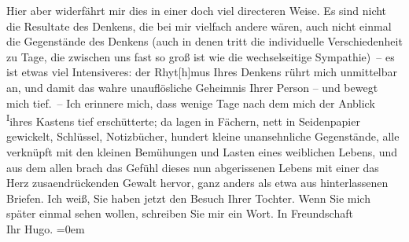\begin{ledgroupsized}[t]{13cm}
                    Hier aber widerfährt mir dies in einer doch viel directeren Weise. Es sind nicht
                    die Resultate des Denkens, die bei mir vielfach andere wären, auch nicht einmal
                    die Gegenstände des Denkens (auch in denen tritt die individuelle
                    Verschiedenheit zu Tage, die zwischen uns fast so groß ist wie die
                    wechselseitige Sympathie) – {\pb}es ist etwas viel Intensiveres: der Rhyt{[}h{]}mus Ihres
                    Denkens rührt mich unmittelbar an, und damit das wahre unauflösliche Geheimnis
                    Ihrer Person – und bewegt mich tief. – Ich erinnere mich, dass wenige Tage nach
                    dem \label{K_L02496_1v}\label{K_L02496_1h} mich der Anblick \substVorne{}\textsuperscript{I}\substDazwischen{}i\substHinten{}hres Kastens tief erschütterte; da lagen in Fächern, nett in
                    Seidenpapier gewickelt, Schlüssel, Notizbücher, hundert kleine unansehnliche
                    Gegenstände, alle verknüpft mit den kleinen Bemühungen und Lasten eines
                    weiblichen Lebens, und aus dem allen brach das Gefühl dieses nun abgerissenen
                    Lebens mit einer das Herz zusa{\geminationm}endrückenden Gewalt
                    hervor, ganz anders als etwa aus hinterlassenen Briefen.\pend
           \pstart
           Ich weiß, Sie haben jetzt den Besuch Ihrer Tochter. Wenn Sie mich später einmal sehen wollen,
                    schreiben Sie mir ein Wort.\pend
           \pstart
           In Freundschaft{\\[\baselineskip]}Ihr \spacefill\mbox{Hugo.}\pend
           \leftskip=0em{}\endnumbering{}\end{ledgroupsized}  \newcommand{\dateiname}{L02496}\newcommand{\titel}{Hugo Hofmannsthal an Arthur Schnitzler, 29. 12. 1927}\newcommand{\editorInnen}{Martin Anton Müller und Gerd-Hermann Susen}
      
